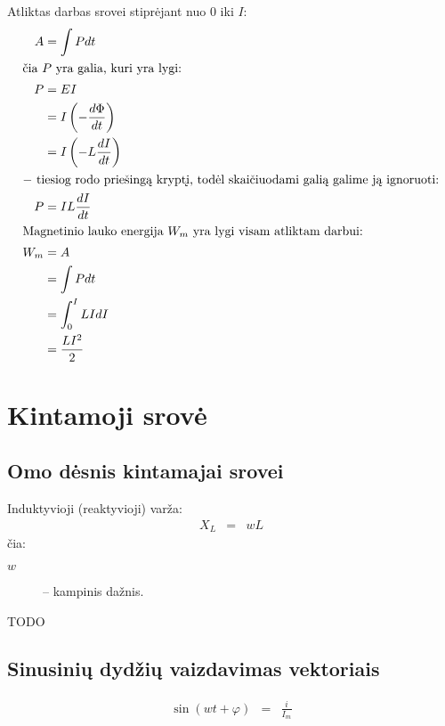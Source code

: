 Atliktas darbas srovei stiprėjant nuo 0 iki $I$:
\begin{align*}
  A
    &= \int P dt \\
  \intertext{čia $P$ yra galia, kuri yra lygi:}
  P
    &= E I \\
    &= I\left( - \frac{d\Phi}{dt} \right) \\
    &= I\left( -L \frac{dI}{dt} \right) \\
  \intertext{$-$ tiesiog rodo priešingą kryptį, todėl skaičiuodami galią
  galime ją ignoruoti:}
  P
    &= IL \frac{dI}{dt} \\
  \intertext{Magnetinio lauko energija $W_{m}$ yra lygi visam atliktam
  darbui:}
  W_{m}
    &= A \\
    &= \int P dt \\
    &= \int_{0}^{I} LI dI \\
    &= \frac{LI^{2}}{2} \\
\end{align*}

\chapter{Kintamoji srovė}

\section{Omo dėsnis kintamajai srovei}

Induktyvioji (reaktyvioji) varža:
\begin{align*}
  X_{L} &=& w L
\end{align*}
čia:
\begin{description}
  \item[$w$] – kampinis dažnis.
\end{description}

\begin{defn}
  TODO
\end{defn}

\section{Sinusinių dydžių vaizdavimas vektoriais}

\begin{align*}
  \sin (wt + \varphi) &=& \frac{i}{I_{m}} \\
\end{align*}
